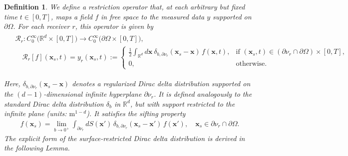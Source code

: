 \documentclass[10pt,a4paper]{amsart}
\newtheorem{definition}{Definition}
\newcommand{\bx}{\boldsymbol{x}}
\begin{document}
\begin{definition}    \label{def:r}
We define a \emph{restriction operator} that, at each arbitrary but fixed time \( t \in [0, T] \), maps a field \( f \) in free space to the measured data \( y \) supported on \( \partial \Omega \). For each receiver \( r \), this operator is given by
\begin{align} \label{eq:r}
    \begin{split}
        &\mathcal{R}_r : C_0^{\infty} \big( \mathbb{R}^d \times [0,T] \big) \to C_0^\infty \big( \partial \Omega \times [0, T] \big), \\
        &\quad \mathcal{R}_r \left[ f \right](\bx_s, t) = y_r(\bx_s, t) :=
        \begin{cases}
            \displaystyle \frac{1}{2}
            \int_{\mathbb{R}^d} d\bx \ \delta_{b, \partial \nu_r}(\bx_s - \bx) \, f(\bx,t), & \text{if } (\bx_s, t) \in (\partial \nu_r \cap \partial \Omega) \times [0, T], \\
            0, & \text{otherwise}.
        \end{cases}
    \end{split}
\end{align}

\noindent
Here, \( \delta_{b,\partial \nu_r}(\bx_s - \bx) \) denotes a regularized Dirac delta distribution supported on the \((d{-}1)\)-dimensional infinite hyperplane \( \partial \nu_r  \). It is defined analogously to the standard Dirac delta distribution \( \delta_b \) in \( \mathbb{R}^d \), but with support restricted to the infinite plane (units: \( \mathrm{m}^{1-d} \)). It satisfies the sifting property
\begin{align} \label{eq:sifting-surface}
    f(\bx_s) = \lim_{b \to 0^+} \int_{\partial \nu_r } dS(\bx') \, \delta_{b,\partial \nu_r}(\bx_s - \bx') \, f(\bx'), \quad \bx_s \in \partial \nu_r \cap \partial \Omega.
\end{align}
The explicit form of the surface-restricted Dirac delta distribution is derived in the following Lemma.
\end{definition}
\end{document}
